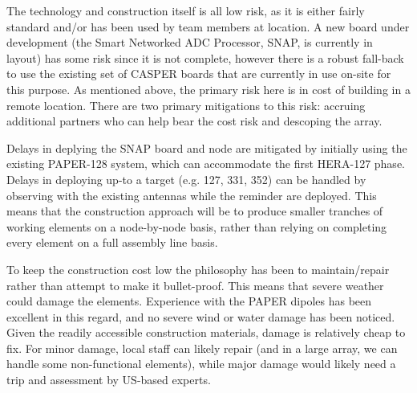 \documentclass[preprint]{aastex}
\begin{document}
The technology and construction itself is all low risk, as it is either fairly standard and/or
has been used by team members at location.  A new board under development (the Smart Networked
ADC Processor, SNAP, is currently in layout) has some risk since it is not complete, however there
is a robust fall-back to use the existing set of CASPER boards that are currently in use on-site for this
purpose.  As mentioned above, the primary risk here is in cost of building in a remote location.
There are two primary mitigations to this risk:  accruing additional partners who can help bear
the cost risk and descoping the array.

Delays in deplying the SNAP board and node are
mitigated by initially using the existing PAPER-128 system, which can accommodate the first 
HERA-127 phase.  Delays in deploying up-to a target (e.g. 127, 331, 352) can be handled by
observing with the existing antennas while the reminder are deployed.  This means that the
construction approach will be to produce smaller tranches of working elements on a node-by-node
basis, rather than relying on completing every element on a full assembly line basis.

To keep the construction cost low the philosophy has been to maintain/repair rather
than attempt to make it bullet-proof. This means that severe weather could damage the
elements. Experience with the PAPER dipoles has been excellent in this regard, and no
severe wind or water damage has been noticed. Given the readily accessible
construction materials, damage is relatively cheap to fix. For minor damage, local
staff can likely repair (and in a large array, we can handle some non-functional
elements), while major damage would likely need a trip and assessment by US-based
experts.
\end{document}
